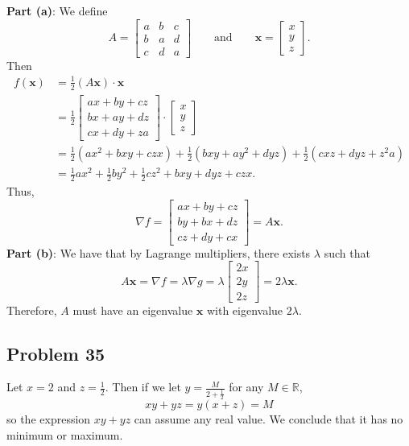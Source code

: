 \documentclass[11pt]{article}
\renewcommand{\vec}[1]{\mathbf{#1}}
\renewcommand{\grad}{\nabla}
\begin{document}
\textbf{Part (a)}: We define
\[
	A = \begin{bmatrix} a & b & c \\ b & a & d \\ c & d & a \end{bmatrix} \qquad \text{and} \qquad \vec{x} = \begin{bmatrix} x \\ y \\ z \end{bmatrix}.
\]
Then
\begin{align*}
	f(\vec{x}) &= \frac{1}{2}(A \vec{x}) \cdot \vec{x} \\ 
	&= \frac{1}{2} \begin{bmatrix} ax + by + cz \\ bx + ay + dz \\ cx + dy + za \end{bmatrix} \cdot \begin{bmatrix} x \\ y \\ z \end{bmatrix} \\
	&= \frac{1}{2} (ax^{2} + bxy + czx) + \frac{1}{2} (bxy + ay^{2} + dyz) + \frac{1}{2} (cxz + dyz + z^{2}a) \\
	&= \tfrac{1}{2} ax^{2} + \tfrac{1}{2} by^{2} + \tfrac{1}{2} cz^{2} + bxy + dyz + czx.
\end{align*}
Thus,
\[
	\grad f = \begin{bmatrix} ax + by + cz \\ by + bx + dz \\ cz + dy + cx \end{bmatrix} = A \vec{x}.
\]
\textbf{Part (b)}: We have that by Lagrange multipliers, there exists $\lambda$ such that
\[
	A \vec{x} = \grad f = \lambda \grad g = \lambda \begin{bmatrix} 2x \\ 2y \\ 2z \end{bmatrix} = 2\lambda \vec{x}.
\]
Therefore, $A$ must have an eigenvalue $\vec{x}$ with eigenvalue $2\lambda$.


\subsection*{Problem 35}

Let $x = 2$ and $z = \tfrac{1}{2}$. Then if we let $y = \tfrac{M}{2 + \tfrac{1}{2}}$ for any $M \in \mathbb{R}$,
\[
	xy + yz = y(x + z) = M
\]
so the expression $xy + yz$ can assume any real value. We conclude that it has no minimum or maximum.
\end{document}
